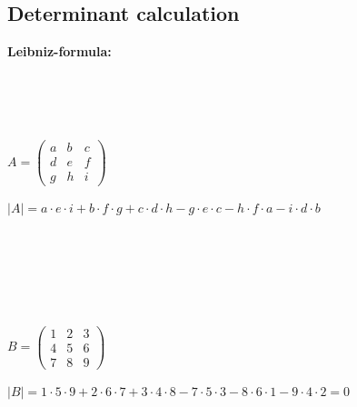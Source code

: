 \documentclass[a4]{scrartcl}
\begin{document}




\subsection*{Determinant calculation}

\textbf{Leibniz-formula:}
\ \\ \ \\
\begin{minipage}{0.1\textwidth}

\ 


\end{minipage}\begin{minipage}{0.3\textwidth}
\ \\
$ A = \begin{pmatrix}
a & b & c  \\
d & e & f \\
g & h & i
\end{pmatrix}$

\end{minipage}
\begin{minipage}{0.5\textwidth}

$|A| = a \cdot e \cdot i +  b \cdot f \cdot g + c \cdot d \cdot h - g \cdot e \cdot c - h \cdot f \cdot a - i \cdot d \cdot b$


\end{minipage}

\ \\ \ \\
\begin{minipage}{0.1\textwidth}

\ 


\end{minipage}\begin{minipage}{0.3\textwidth}
\ \\
$ B = \begin{pmatrix}
1 & 2 & 3  \\
4 & 5 & 6 \\
7 & 8 & 9
\end{pmatrix}$

\end{minipage}
\begin{minipage}{0.5\textwidth}

$|B| = 1 \cdot 5 \cdot 9 +  2 \cdot 6 \cdot 7 + 3 \cdot 4 \cdot 8 - 7 \cdot 5 \cdot 3 - 8 \cdot 6 \cdot 1 - 9 \cdot 4 \cdot 2 = 0$


\end{minipage}
\end{document}
